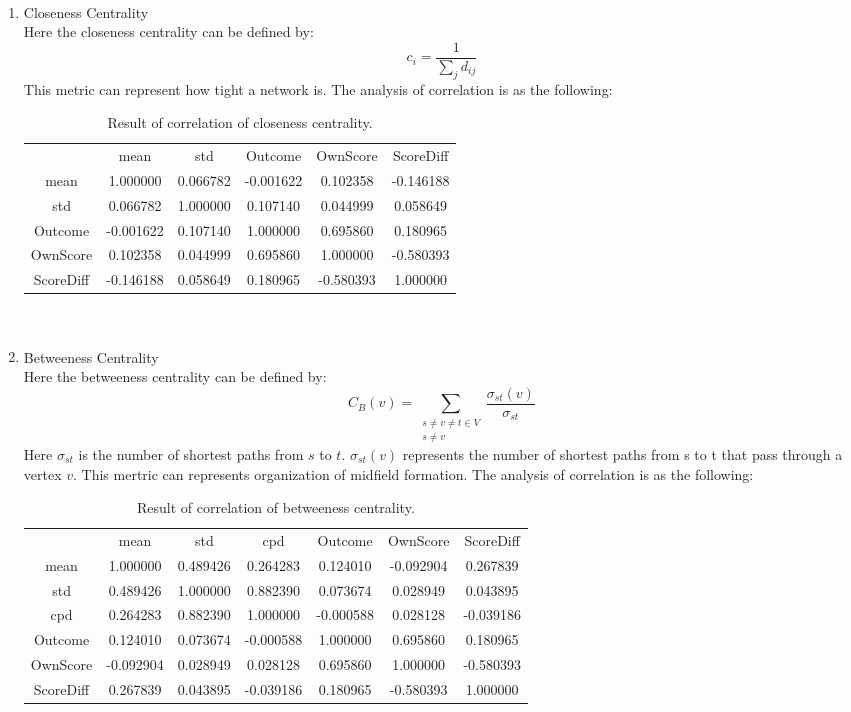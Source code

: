 \documentclass{mcmthesis}
\newcommand{\upcite}[1]{\textsuperscript{\textsuperscript{\cite{#1}}}}
\begin{document}
\begin{enumerate}
			\item Closeness Centrality\upcite{4} \\
			Here the closeness centrality can be defined by: 
			$$c_i=\frac{1}{\sum\limits_jd_{ij}}$$
			This metric can represent how tight a network is. The analysis of correlation is as the following: 
			\begin{table}[h!]
				\centering
				\begin{tabular}{cccccc}
					\toprule
					 & mean & std & Outcome & OwnScore & ScoreDiff \\
					mean & 1.000000 & 0.066782 & -0.001622 & 0.102358 & -0.146188 \\
					std & 0.066782 & 1.000000 & 0.107140 & 0.044999 & 0.058649 \\
					Outcome & -0.001622 & 0.107140 & 1.000000 & 0.695860 & 0.180965 \\
					OwnScore & 0.102358 & 0.044999 & 0.695860 & 1.000000 & -0.580393 \\
					ScoreDiff & -0.146188 & 0.058649 & 0.180965 & -0.580393 & 1.000000 \\
					\bottomrule
				\end{tabular}
				\caption{Result of correlation of closeness centrality. }
			\end{table} \\
		
			\item Betweeness Centrality\upcite{4} \\
			Here the betweeness centrality can be defined by: \\
			$$C_B\left(v\right)=\sum\limits_{\substack{s\neq v\neq t\in V \\ s\neq v}}\frac{\sigma_{st}\left(v\right)}{\sigma_{st}}$$
			Here $\sigma_{st}$ is the number of shortest paths from $s$ to $t$. $\sigma_{st}\left(v\right)$ represents the number of shortest paths from s to t that pass through a vertex $v$. This mertric can represents organization of midfield formation. The analysis of correlation is as the following: 
			\begin{table}[h!]
				\centering
				\begin{tabular}{ccccccc}
					\toprule
					 & mean & std & cpd & Outcome & OwnScore & ScoreDiff \\
					mean & 1.000000 & 0.489426 & 0.264283 & 0.124010 & -0.092904 & 0.267839 \\
					std & 0.489426 & 1.000000 & 0.882390 & 0.073674 & 0.028949 & 0.043895 \\
					cpd & 0.264283 & 0.882390 & 1.000000 & -0.000588 & 0.028128 & -0.039186 \\
					Outcome & 0.124010 & 0.073674 & -0.000588 & 1.000000 & 0.695860 & 0.180965 \\
					OwnScore & -0.092904 & 0.028949 & 0.028128 & 0.695860 & 1.000000 & -0.580393 \\
					ScoreDiff & 0.267839 & 0.043895 & -0.039186 & 0.180965 & -0.580393 & 1.000000 \\
					\bottomrule
				\end{tabular}
				\caption{Result of correlation of betweeness centrality. }
			\end{table}
			

\end{enumerate}
\end{document}
